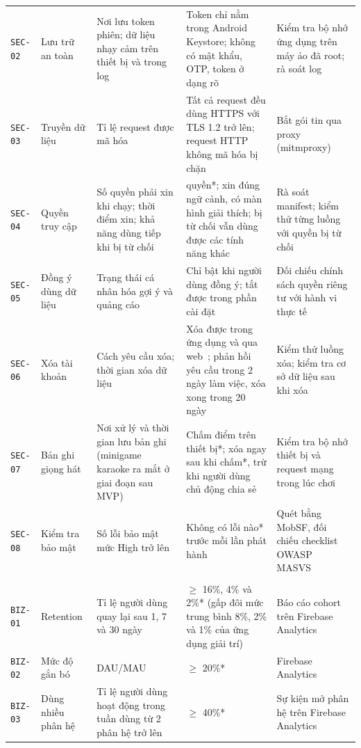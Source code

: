 \begin{longtable}{@{}>{\raggedright\arraybackslash}p{1.2cm}>{\raggedright\arraybackslash}p{2.4cm}>{\raggedright\arraybackslash}p{4.2cm}>{\raggedright\arraybackslash}p{3.7cm}>{\raggedright\arraybackslash}p{3.5cm}@{}}
\texttt{SEC-02} & Lưu trữ an toàn & Nơi lưu token phiên; dữ liệu nhạy cảm trên thiết bị và trong log & Token chỉ nằm trong Android Keystore; không có mật khẩu, OTP, token ở dạng rõ~\cite{owasp-masvs} & Kiểm tra bộ nhớ ứng dụng trên máy ảo đã root; rà soát log \\
\texttt{SEC-03} & Truyền dữ liệu & Tỉ lệ request được mã hóa & Tất cả request đều dùng HTTPS với TLS 1.2 trở lên; request HTTP không mã hóa bị chặn~\cite{owasp-masvs} & Bắt gói tin qua proxy (mitmproxy) \\
\texttt{SEC-04} & Quyền truy cập & Số quyền phải xin khi chạy; thời điểm xin; khả năng dùng tiếp khi bị từ chối & 2 quyền*; xin đúng ngữ cảnh, có màn hình giải thích; bị từ chối vẫn dùng được các tính năng khác~\cite{android-permissions} & Rà soát manifest; kiểm thử từng luồng với quyền bị từ chối \\
\texttt{SEC-05} & Đồng ý dùng dữ liệu & Trạng thái cá nhân hóa gợi ý và quảng cáo & Chỉ bật khi người dùng đồng ý; tắt được trong phần cài đặt~\cite{luat-bvdlcn-2025} & Đối chiếu chính sách quyền riêng tư với hành vi thực tế \\
\texttt{SEC-06} & Xóa tài khoản & Cách yêu cầu xóa; thời gian xóa dữ liệu & Xóa được trong ứng dụng và qua web~\cite{play-account-deletion}; phản hồi yêu cầu trong 2 ngày làm việc, xóa xong trong 20 ngày~\cite{nd356-2025} & Kiểm thử luồng xóa; kiểm tra cơ sở dữ liệu sau khi xóa \\
\texttt{SEC-07} & Bản ghi giọng hát & Nơi xử lý và thời gian lưu bản ghi (minigame karaoke ra mắt ở giai đoạn sau MVP) & Chấm điểm trên thiết bị*; xóa ngay sau khi chấm*, trừ khi người dùng chủ động chia sẻ & Kiểm tra bộ nhớ thiết bị và request mạng trong lúc chơi \\
\texttt{SEC-08} & Kiểm tra bảo mật & Số lỗi bảo mật mức High trở lên & Không có lỗi nào* trước mỗi lần phát hành & Quét bằng MobSF, đối chiếu checklist OWASP MASVS~\cite{owasp-masvs} \\
\midrule
\multicolumn{5}{@{}l}{\textit{Business Goals}} \\
\texttt{BIZ-01} & Retention & Tỉ lệ người dùng quay lại sau 1, 7 và 30 ngày & $\ge$ 16\%, 4\% và 2\%* (gấp đôi mức trung bình 8\%, 2\% và 1\% của ứng dụng giải trí)~\cite{adjust2026vn} & Báo cáo cohort trên Firebase Analytics \\
\texttt{BIZ-02} & Mức độ gắn bó & DAU/MAU & $\ge$ 20\%* & Firebase Analytics \\
\texttt{BIZ-03} & Dùng nhiều phân hệ & Tỉ lệ người dùng hoạt động trong tuần dùng từ 2 phân hệ trở lên & $\ge$ 40\%* & Sự kiện mở phân hệ trên Firebase Analytics \\

\end{longtable}
